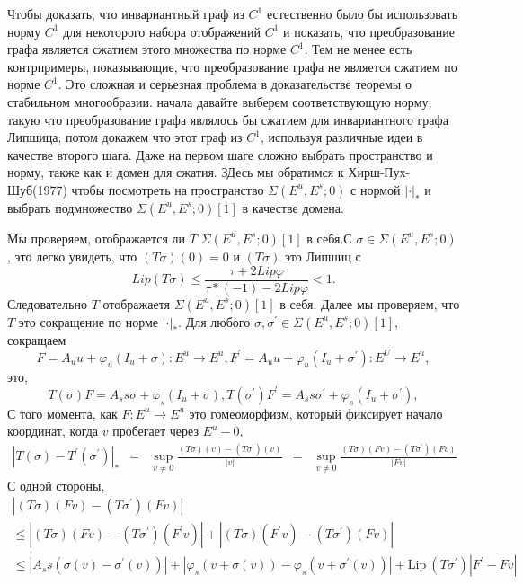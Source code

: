 \begin{demo}
\begin{remark}
Чтобы доказать, что инвариантный граф из $C^1$  естественно было бы использовать норму $C^1$ для некоторого набора отображений $C^1$ и показать, что преобразование графа является сжатием этого множества по норме $C^1$.
Тем не менее есть контрпримеры, показывающие, что преобразование графа не является сжатием по норме $C^1$. Это сложная и серьезная проблема в доказательстве теоремы о стабильном многообразии. 
начала давайте выберем соответствующую норму, такую что преобразование графа являлось бы сжатием для инвариантного графа Липшица; потом докажем что этот граф из $C^1$, используя различные идеи в качестве второго шага. Даже на первом шаге сложно выбрать пространство и норму, также как и домен для сжатия. ЗДесь мы обратимся к Хирш-Пух-Шуб(1977) чтобы посмотреть на пространство $\Sigma(E^u, E^s;0)$ с нормой $| \cdot |_*$ и выбрать подмножество $\Sigma(E^u, E^s;0)[1]$ в качестве домена.
\end{remark}
Мы проверяем, отображается ли $T$  $\Sigma(E^u,E^s;0)[1]$ в себя.С $\sigma \in \Sigma(E^u,E^s;0)$, это легко увидеть, что $(T\sigma)(0)=0$ и $(T\sigma)$ это Липшиц с
$$
Lip(T\sigma)\leqslant \frac{\tau +2Lip\varphi}{\tau*(-1) - 2Lip\varphi} < 1.
$$
Следовательно $T$ отображаетя $\Sigma(E^u,E^s;0)[1]$ в себя.
Далее мы проверяем, что $T$ это сокращение по норме $|\cdot|_*$. Для любого $\sigma, \sigma^{\prime} \in \Sigma(E^u,E^s;0)[1]$, сокращаем
$$
F = A_uu + \varphi _u(I_u + \sigma) : E^u \rightarrow E^u,
F^{\prime} = A_uu + \varphi _u(I_u + \sigma^{\prime}) : E^U \rightarrow E^u,
$$
это,
$$
T(\sigma)F = A_ss \sigma + \varphi_s(I_u + \sigma),
T(\sigma^{\prime})F^{\prime} = A_ss \sigma^{\prime} + \varphi_s(I_u + \sigma^{\prime}),
$$
С того момента, как $F : E^u \rightarrow E^u$ это гомеоморфизм, который фиксирует начало координат, когда $v$ пробегает через $E^u - {0}$,
$$
\begin{array}{rclll}
|T(\sigma) - T^{\prime}(\sigma^{\prime})|_* &=& \sup\limits_{v \neq 0} \frac{(T\sigma)(v) - (T\sigma^{\prime})(v)}{|v|}
&=& \sup\limits_{v \neq 0} \frac{(T\sigma)(Fv) - (T\sigma^{\prime})(Fv)}{|Fv|}
\end{array}
$$
С одной стороны,
$$
\begin{array}{lclll}
|(T\sigma)(Fv) - (T\sigma^{\prime})(Fv)| \\
\leqslant |(T\sigma)(Fv) - (T\sigma^{\prime})(F^{\prime} v)| + |(T\sigma)(F^{\prime} v) - (T\sigma^{\prime})(Fv)| \\
\leqslant |A_ss(\sigma(v) - \sigma^{\prime}(v))| + |\varphi_s(v + \sigma(v)) - \varphi_s(v + \sigma^{\prime}(v))| + \mathrm{Lip} \ (T\sigma^{\prime})|F^{\prime}  - F v| \\

\end{array}$$
\end{demo}
